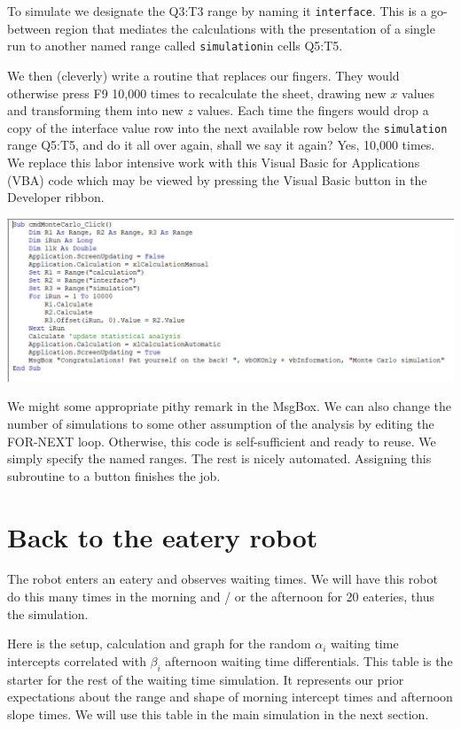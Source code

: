 \documentclass[
]{book}
\begin{document}
To simulate we designate the Q3:T3 range by naming it \texttt{interface}. This is a go-between region that mediates the calculations with the presentation of a single run to another named range called \texttt{simulation}in cells Q5:T5.

We then (cleverly) write a routine that replaces our fingers. They would otherwise press F9 10,000 times to recalculate the sheet, drawing new \(x\) values and transforming them into new \(z\) values. Each time the fingers would drop a copy of the interface value row into the next available row below the \texttt{simulation} range Q5:T5, and do it all over again, shall we say it again? Yes, 10,000 times. We replace this labor intensive work with this Visual Basic for Applications (VBA) code which may be viewed by pressing the Visual Basic button in the Developer ribbon.

\includegraphics{images/05/cholesky-demo-vba.jpg}

We might some appropriate pithy remark in the MsgBox. We can also change the number of simulations to some other assumption of the analysis by editing the FOR-NEXT loop. Otherwise, this code is self-sufficient and ready to reuse. We simply specify the named ranges. The rest is nicely automated. Assigning this subroutine to a button finishes the job.

\hypertarget{back-to-the-eatery-robot}{%
\section{Back to the eatery robot}\label{back-to-the-eatery-robot}}

The robot enters an eatery and observes waiting times. We will have this robot do this many times in the morning and / or the afternoon for 20 eateries, thus the simulation.

Here is the setup, calculation and graph for the random \(\alpha_i\) waiting time intercepts correlated with \(\beta_i\) afternoon waiting time differentials. This table is the starter for the rest of the waiting time simulation. It represents our prior expectations about the range and shape of morning intercept times and afternoon slope times. We will use this table in the main simulation in the next section.
\end{document}
